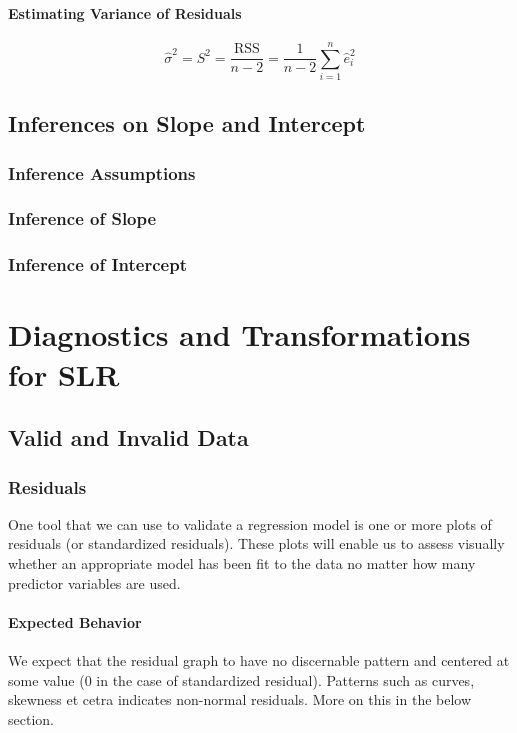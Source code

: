 \documentclass[11pt]{article}
\begin{document}
\paragraph{Estimating Variance of Residuals}
\begin{equation*}
    \hat{\sigma}^2 = S^{2}=\frac{\mathrm{RSS}}{n-2}=\frac{1}{n-2} \sum_{i=1}^{n} \hat{e}_{i}^{2}
\end{equation*}


\subsection{Inferences on Slope and Intercept}
\subsubsection{Inference Assumptions}
\subsubsection{Inference of Slope}
\subsubsection{Inference of Intercept}




\section{Diagnostics and Transformations for SLR}
\subsection{Valid and Invalid Data}
\subsubsection{Residuals}
One tool that we can use to validate a regression model is one or more plots of residuals (or standardized residuals). These plots will enable us to assess visually whether an appropriate model has been fit to the data no matter how many predictor variables are used. 

\paragraph{Expected Behavior} We expect that the residual graph to have no discernable pattern and centered at some value (0 in the case of standardized residual). Patterns such as curves, skewness et cetra indicates non-normal residuals. More on this in the below section.
\end{document}
